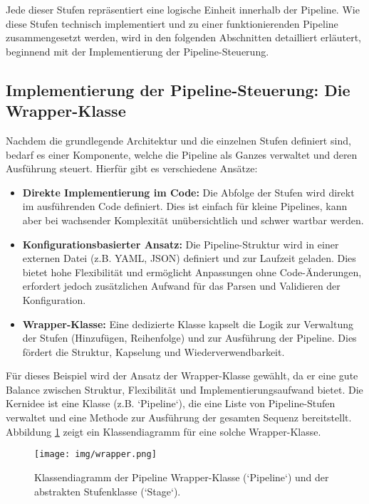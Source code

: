 \documentclass[11pt, a4paper]{article}
\begin{document}
Jede dieser Stufen repräsentiert eine logische Einheit innerhalb der Pipeline. Wie diese Stufen technisch implementiert und zu einer funktionierenden Pipeline zusammengesetzt werden, wird in den folgenden Abschnitten detailliert erläutert, beginnend mit der Implementierung der Pipeline-Steuerung.

\subsection{Implementierung der Pipeline-Steuerung: Die Wrapper-Klasse}
Nachdem die grundlegende Architektur und die einzelnen Stufen definiert sind, bedarf es einer Komponente, welche die Pipeline als Ganzes verwaltet und deren Ausführung steuert. Hierfür gibt es verschiedene Ansätze:

\begin{itemize}
    \item \textbf{Direkte Implementierung im Code:} Die Abfolge der Stufen wird direkt im ausführenden Code definiert. Dies ist einfach für kleine Pipelines, kann aber bei wachsender Komplexität unübersichtlich und schwer wartbar werden.
    \item \textbf{Konfigurationsbasierter Ansatz:} Die Pipeline-Struktur wird in einer externen Datei (z.B. YAML, JSON) definiert und zur Laufzeit geladen. Dies bietet hohe Flexibilität und ermöglicht Anpassungen ohne Code-Änderungen, erfordert jedoch zusätzlichen Aufwand für das Parsen und Validieren der Konfiguration.
    \item \textbf{Wrapper-Klasse:} Eine dedizierte Klasse kapselt die Logik zur Verwaltung der Stufen (Hinzufügen, Reihenfolge) und zur Ausführung der Pipeline. Dies fördert die Struktur, Kapselung und Wiederverwendbarkeit.
\end{itemize}

Für dieses Beispiel wird der Ansatz der Wrapper-Klasse gewählt, da er eine gute Balance zwischen Struktur, Flexibilität und Implementierungsaufwand bietet. Die Kernidee ist eine Klasse (z.B. `Pipeline`), die eine Liste von Pipeline-Stufen verwaltet und eine Methode zur Ausführung der gesamten Sequenz bereitstellt. Abbildung \ref{fig:wrapper} zeigt ein Klassendiagramm für eine solche Wrapper-Klasse.

\begin{figure}[htbp]
    \centering
    \texttt{[image: img/wrapper.png]}
    \caption{Klassendiagramm der Pipeline Wrapper-Klasse (`Pipeline`) und der abstrakten Stufenklasse (`Stage`).}
    \label{fig:wrapper}
\end{figure}
\end{document}
